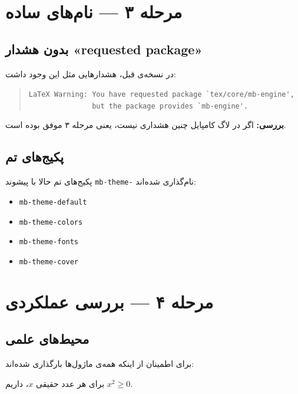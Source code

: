 \documentclass{matinbook}
\begin{document}
\section{مرحله ۳ — نام‌های ساده}
\label{sec:stage3}

\subsection{بدون هشدار «requested package»}

در نسخه‌ی قبل، هشدارهایی مثل این وجود داشت:

\begin{quote}
\verb|LaTeX Warning: You have requested package `tex/core/mb-engine',| \\
\verb|               but the package provides `mb-engine'.|
\end{quote}

\textbf{بررسی:} اگر در لاگ کامپایل چنین هشداری نیست، یعنی مرحله ۳
موفق بوده است.

\subsection{پکیج‌های تم}

پکیج‌های تم حالا با پیشوند \verb|mb-theme-| نام‌گذاری شده‌اند:
\begin{itemize}
    \item \verb|mb-theme-default|
    \item \verb|mb-theme-colors|
    \item \verb|mb-theme-fonts|
    \item \verb|mb-theme-cover|
\end{itemize}

\section{مرحله ۴ — بررسی عملکردی}
\label{sec:stage4}

\subsection{محیط‌های علمی}

برای اطمینان از اینکه همه‌ی ماژول‌ها بارگذاری شده‌اند:

\begin{theorem}
    برای هر عدد حقیقی $x$، داریم $x^2 \geq 0$.
\end{theorem}
\end{document}
